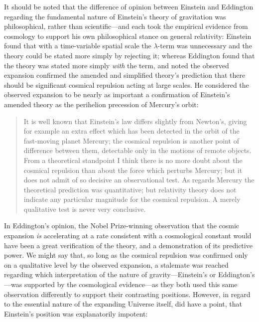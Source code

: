 \documentclass[12 pt]{article}
\begin{document}
It should be noted that the difference of opinion between Einstein and Eddington regarding the fundamental nature of Einstein's theory of gravitation was philosophical, rather than scientific---and each took the empirical evidence from cosmology to support his own philosophical stance on general relativity: Einstein found that with a time-variable spatial scale the $\lambda$-term was unnecessary and the theory could be stated more simply by rejecting it; whereas Eddington found that the theory was stated more simply \textit{with} the term, and noted the observed expansion confirmed the amended and simplified theory's prediction that there should be significant cosmical repulsion acting at large scales. He considered the observed expansion to be nearly as important a confirmation of Einstein's amended theory as the perihelion precession of Mercury's orbit:
\begin{quote}
It is well known that Einstein's law differs slightly from Newton's, giving for example an extra effect which has been detected in the orbit of the fast-moving planet Mercury; the cosmical repulsion is another point of difference between them, detectable only in the motions of remote objects. From a theoretical standpoint I think there is no more doubt about the cosmical repulsion than about the force which perturbs Mercury; but it does not admit of so decisive an observational test. As regards Mercury the theoretical prediction was quantitative; but relativity theory does not indicate any particular magnitude for the cosmical repulsion. A merely qualitative test is never very conclusive.
\end{quote}
In Eddington's opinion, the Nobel Prize-winning observation that the cosmic expansion \textit{is} accelerating at a rate consistent with a cosmological constant \citep{Riess1998,Perlmutter1999} would have been a great verification of the theory, and a demonstration of its predictive power.
We might say that, so long as the cosmical repulsion was confirmed only on a qualitative level by the observed expansion, a stalemate was reached regarding which interpretation of the nature of gravity---Einstein's or Eddington's---was supported by the cosmological evidence---as they both used this same observation differently to support their contrasting positions. However, in regard to the essential nature of the expanding Universe itself, \citet{Eddington1933} did have a point, that Einstein's position was explanatorily impotent:
\end{document}
